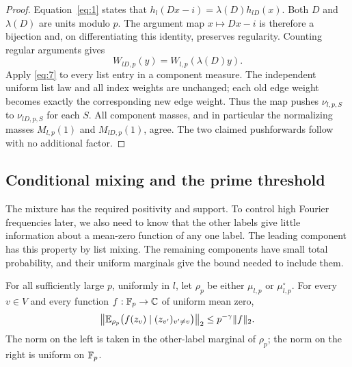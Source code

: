 \begin{proof}
Equation~\eqref{eq:1} states that
$h_l(Dx-i)=\lambda(D)h_{lD}(x)$.  Both $D$ and $\lambda(D)$ are
units modulo $p$.  The argument map $x\mapsto Dx-i$ is therefore a
bijection and, on differentiating this identity, preserves regularity.
Counting regular arguments gives
\[
 W_{lD,p}(y)=W_{l,p}(\lambda(D)y).
\]
Apply \eqref{eq:7} to every list entry in a component measure.  The
independent uniform list law and all index weights are unchanged;
each old edge weight becomes exactly the corresponding new edge
weight.  Thus the map pushes $\nu_{l,p,S}$ to $\nu_{lD,p,S}$ for
each $S$.  All component masses, and in particular the normalizing
masses $M_{l,p}(1)$ and $M_{lD,p}(1)$, agree.  The two claimed
pushforwards follow with no additional factor.
\end{proof}

\subsection{Conditional mixing and the prime threshold}

The mixture has the required positivity and support.  To control high
Fourier frequencies later, we also need to know that the other labels
give little information about a mean-zero function of any one label.
The leading component has this property by list mixing.  The remaining
components have small total probability, and their uniform marginals
give the bound needed to include them.

\begin{lemma}
\label{tuple:conditional-mixing}
For all sufficiently large $p$, uniformly in $l$, let $\rho_p$ be
either $\mu_{l,p}$ or $\mu_{l,p}^{\circ}$.  For every $v\in V$ and
every function $f:\mathbb F_p\to\mathbb C$ of uniform mean zero,
\begin{equation}
 \left\|\mathbb E_{\rho_p}\bigl(f(z_v)\mid
                         (z_{v'})_{v'\ne v}\bigr)\right\|_2
       \le p^{-\gamma}\|f\|_2.
 \label{eq:8}
\end{equation}
The norm on the left is taken in the other-label marginal of
$\rho_p$; the norm on the right is uniform on $\mathbb F_p$.
\end{lemma}

